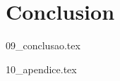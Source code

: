 \documentclass[
  oneside,
  11pt, a4paper,
  footinclude=true,
  headinclude=true,
  cleardoublepage=empty
]{scrbook}
\begin{document}

	\chapter{Conclusion}
    {09_conclusao.tex}
			

	

	
    {10_apendice.tex}
	
\end{document}
